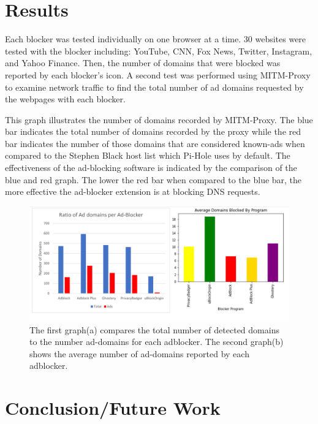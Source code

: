 \documentclass[sigsmall]{acmart}
\begin{document}
\section*{Results}
Each blocker was tested individually on one browser at a time. 30 websites were tested with the blocker including: YouTube, CNN, Fox News, Twitter, Instagram, and Yahoo Finance.
 Then, the number of domains that were blocked was reported by each blocker's icon.
 A second test was performed using MITM-Proxy to examine network traffic to find the total number of ad domains requested by the webpages with each blocker.

This graph illustrates the number of domains recorded by MITM-Proxy.
The blue bar indicates the total number of domains recorded by the proxy while the red bar indicates the number of those domains that are considered known-ads when compared to the Stephen Black host list which Pi-Hole uses by default.
The effectiveness of the ad-blocking software is indicated by the comparison of the blue and red graph. The lower the red bar when compared to the blue bar, the more effective the ad-blocker extension is at blocking DNS requests.

\begin{figure}[h]
  \includegraphics[scale =0.5]{Edit1.png}
  \caption{The first graph(a) compares the total number of detected domains to the number ad-domains for each adblocker. The second graph(b) shows the average number of ad-domains reported by each adblocker.}
  \label{fig:graph1ab}
\end{figure}

\section*{Conclusion/Future Work}




\end{document}
